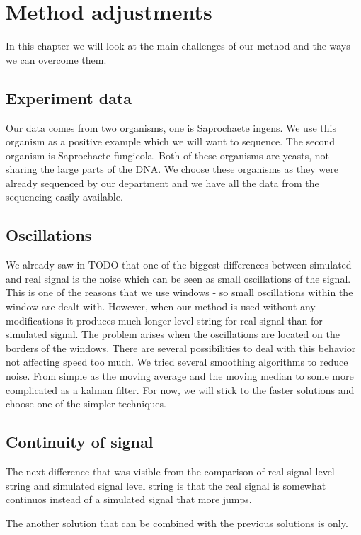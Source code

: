\chapter{Method adjustments}

\label{kap:methAdjust} %

In this chapter we will look at the main challenges of our method and the ways
we can overcome them.

\section{Experiment data}

Our data comes from two organisms, one is Saprochaete ingens. We use this organism
as a positive example which we will want to sequence. The second organism is
Saprochaete fungicola. Both of these organisms are yeasts, not sharing the large
parts of the DNA. We choose these organisms as they were already sequenced by our
department and we have all the data from the sequencing easily available.

\section{Oscillations}

We already saw in TODO that one of the biggest differences between simulated and
real signal is the noise which can be seen as small oscillations of the signal. This is
one of the reasons that we use windows - so small oscillations within the window
are dealt with. However, when our method is used without any modifications it
produces much longer level string for real signal than for simulated signal.
The problem arises when the oscillations are located on the borders of the windows.
There are several possibilities to deal with this behavior not affecting speed too
much. We tried several smoothing algorithms to reduce noise. From simple as the
moving average and the moving median to some more complicated as a kalman filter.
For now, we will stick to the faster solutions and choose one of the simpler techniques.

\section{Continuity of signal}

The next difference that was visible from the comparison of real signal level string
and simulated signal level string is that the real signal is somewhat continuos instead
of a simulated signal that more jumps.

The another solution that can be combined with the previous solutions is only.

